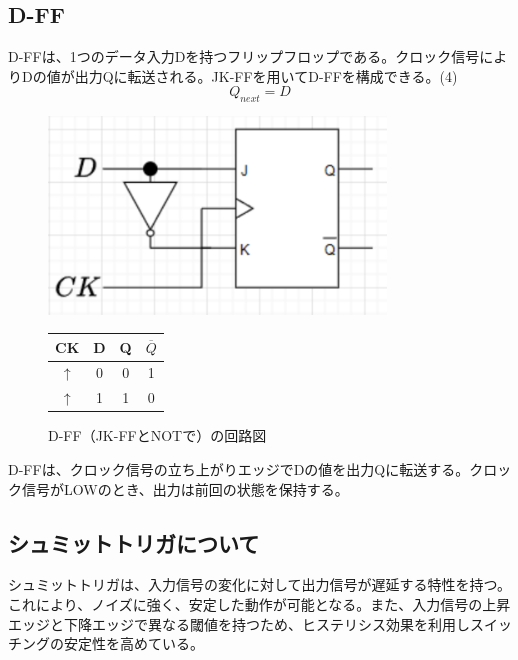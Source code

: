 \documentclass{jlreq}
\numberwithin{equation}{section}
\begin{document}
\subsection{D-FF}
D-FFは、1つのデータ入力Dを持つフリップフロップである。クロック信号によりDの値が出力Qに転送される。JK-FFを用いてD-FFを構成できる。(4)
\begin{equation}
  Q_{next} = D
\end{equation}
\begin{figure}[H]
  \centering
  \begin{minipage}{0.45\textwidth}
    \centering
    \includegraphics[width=0.8\textwidth]{assets/d-ff.png}
    \caption{D-FF（JK-FFとNOTで）の回路図}
  \end{minipage}
  \hfill
  \begin{minipage}{0.45\textwidth}
    \centering
      \label{tab:d_ff_truth_table}
      \begin{tabular}{|c|c|c|c|}
        \hline
        CK & D & Q & $\overline{Q}$ \\ \hline
        $\uparrow$ & 0 & 0 & 1 \\ \hline
        $\uparrow$ & 1 & 1 & 0 \\ \hline
      \end{tabular}
  \end{minipage}
\end{figure}
D-FFは、クロック信号の立ち上がりエッジでDの値を出力Qに転送する。クロック信号がLOWのとき、出力は前回の状態を保持する。

\subsection{シュミットトリガについて}
シュミットトリガは、入力信号の変化に対して出力信号が遅延する特性を持つ。これにより、ノイズに強く、安定した動作が可能となる。また、入力信号の上昇エッジと下降エッジで異なる閾値を持つため、ヒステリシス効果を利用しスイッチングの安定性を高めている。
\end{document}
